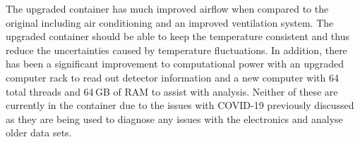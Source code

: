 The upgraded container has much improved airflow when compared to the original including air conditioning and an improved ventilation system. The upgraded container should be able to keep the temperature consistent and thus reduce the uncertainties caused by temperature fluctuations. In addition, there has been a significant improvement to computational power with an upgraded computer rack to read out detector information and a new computer with 64 total threads and 64\,GB of RAM to assist with analysis. Neither of these are currently in the container due to the issues with COVID-19 previously discussed as they are being used to diagnose any issues with the electronics and analyse older data sets.  






